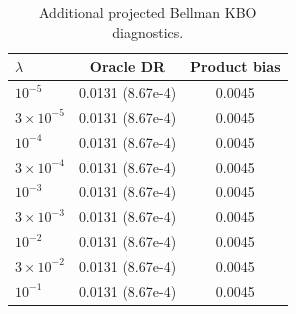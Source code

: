 \begin{table}[t]
\centering
\small
\setlength{\tabcolsep}{5pt}
\caption{Additional projected Bellman KBO diagnostics.}
\label{tab:generated-bellman-b4-appendix}
\begin{tabular}{lcc}
\toprule
$\lambda$ & Oracle DR & Product bias \\
\midrule
$10^{-5}$ & 0.0131 (8.67e-4) & 0.0045 \\
$3\times 10^{-5}$ & 0.0131 (8.67e-4) & 0.0045 \\
$10^{-4}$ & 0.0131 (8.67e-4) & 0.0045 \\
$3\times 10^{-4}$ & 0.0131 (8.67e-4) & 0.0045 \\
$10^{-3}$ & 0.0131 (8.67e-4) & 0.0045 \\
$3\times 10^{-3}$ & 0.0131 (8.67e-4) & 0.0045 \\
$10^{-2}$ & 0.0131 (8.67e-4) & 0.0045 \\
$3\times 10^{-2}$ & 0.0131 (8.67e-4) & 0.0045 \\
$10^{-1}$ & 0.0131 (8.67e-4) & 0.0045 \\
\bottomrule
\end{tabular}
\end{table}
